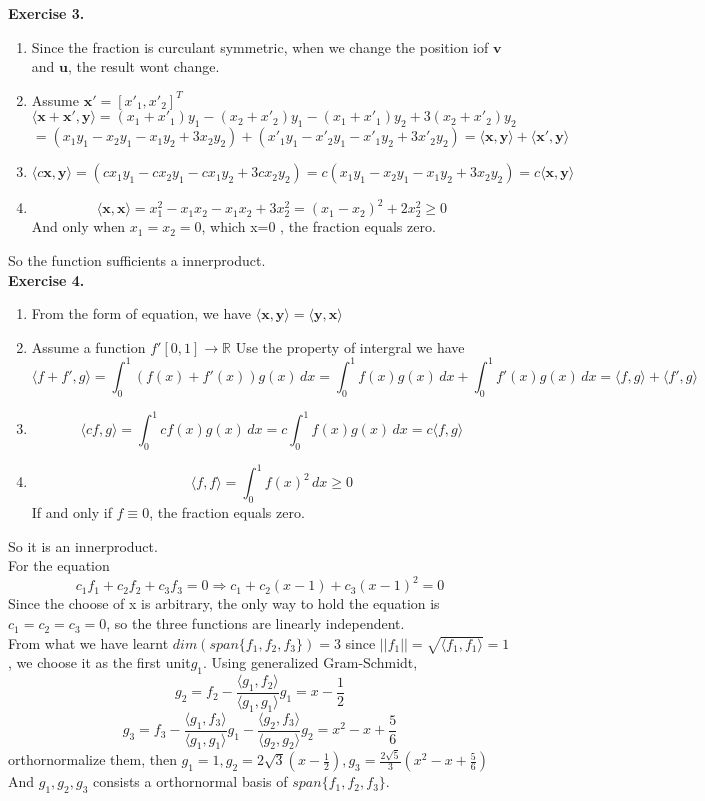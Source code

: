 \documentclass{article}
\begin{document}
\textbf{Exercise 3.}\\

\begin{enumerate}
    \item Since the fraction is curculant symmetric, when we change the position iof $\mathbf{v}$ and $\mathbf{u}$, the result wont change.
    \item Assume $\mathbf{x}'=[x'_1,x'_2]^T$
    \[
    \langle\mathbf{x}+\mathbf{x}',\mathbf{y}\rangle=(x_1+x'_1)y_1-(x_2+x'_2)y_1-(x_1+x'_1)y_2+3(x_2+x'_2)y_2
    \]
    \[
    =(x_1y_1-x_2y_1-x_1y_2+3x_2y_2)+(x'_1y_1-x'_2y_1-x'_1y_2+3x'_2y_2)= \langle\mathbf{x},\mathbf{y}\rangle+ \langle\mathbf{x}',\mathbf{y}\rangle
    \]
    \item \[
        \langle c\mathbf{x},\mathbf{y}\rangle=(cx_1y_1-cx_2y_1-cx_1y_2+3cx_2y_2)=c(x_1y_1-x_2y_1-x_1y_2+3x_2y_2)=c\langle \mathbf{x},\mathbf{y}\rangle
    \]
    \item \[
        \langle \mathbf{x},\mathbf{x}\rangle=x_1^2-x_1x_2-x_1x_2+3x_2^2=(x_1-x_2)^2+2x_2^2 \geq 0
    \]
    And only when $x_1=x_2=0$, which x=0 , the fraction equals zero.
\end{enumerate}
So the function sufficients a innerproduct.\\

\textbf{Exercise 4.}\\

\begin{enumerate}
    \item From the form of equation, we have $\langle \mathbf{x},\mathbf{y}\rangle=\langle \mathbf{y},\mathbf{x}\rangle$
    \item Assume a function $f'[0,1]\rightarrow \mathbb{R}$ Use the property of intergral we have
    \[
        \langle f+f',g\rangle=\int_{0}^{1}(f(x)+f'(x))g(x)\,dx=\int_{0}^{1}f(x)g(x)\,dx+\int_{0}^{1}f'(x)g(x)\,dx=\langle f,g\rangle+\langle f',g\rangle
    \]
    \item \[
        \langle cf,g\rangle=\int_{0}^{1}cf(x)g(x)\,dx=c\int_{0}^{1}f(x)g(x)\,dx=c\langle f,g\rangle
    \]
    \item \[
    \langle f,f \rangle=\int_{0}^{1}f(x)^2\,dx \geq 0
    \]
    If and only if $f\equiv 0$, the fraction equals zero.
\end{enumerate}
So it is an innerproduct.\\

For the equation \[
c_1f_1+c_2f_2+c_3f_3=0 \Rightarrow c_1+c_2(x-1)+c_3(x-1)^2=0
\]
Since the choose of x is arbitrary, the only way to hold the equation is $c_1=c_2=c_3=0$, so the three functions are linearly independent.\\

From what we have learnt $dim(span\{f_1,f_2,f_3\})=3$ since $||f_1||=\sqrt{\langle f_1,f_1\rangle}=1$, we choose it as the first unit$g_1$.
Using generalized Gram-Schmidt, 
\[
g_2=f_2-\frac{\langle g_1,f_2\rangle}{\langle g_1,g_1\rangle}g_1=x-\frac{1}{2}
\]
\[
g_3=f_3-\frac{\langle g_1,f_3\rangle}{\langle g_1,g_1\rangle}g_1-\frac{\langle g_2,f_3\rangle}{\langle g_2,g_2\rangle}g_2=x^2-x+\frac{5}{6}
\]
orthornormalize them, then $g_1=1,g_2=2\sqrt{3}(x-\frac{1}{2}),g_3=\frac{2\sqrt{5}}{3}(x^2-x+\frac{5}{6})$
And $g_1,g_2,g_3$ consists a orthornormal basis of $span\{f_1,f_2,f_3\}$.
\end{document}
